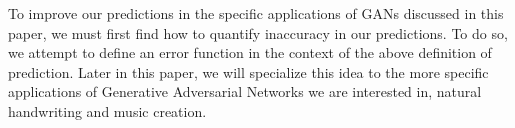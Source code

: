 \documentclass[12pt]{amsart}
\newcommand{\RR}{{\mathbb R}}
\theoremstyle{definition}
\newtheorem{example}[theorem]{Example}
\theoremstyle{remark}
\begin{document}
%
%
To improve our predictions in the specific applications of GANs discussed in this
paper, we must first find how to quantify inaccuracy in our predictions. To do so,
we attempt to define an error function in the context of the above definition of
prediction. Later in this paper, we will specialize this idea to the more specific 
applications of Generative Adversarial Networks we are interested in, natural
handwriting and music creation.
\end{document}

